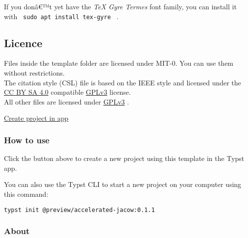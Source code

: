If you donâ€™t yet have the \emph{TeX Gyre Termes} font family, you can
install it with \texttt{\ sudo\ apt\ install\ tex-gyre\ } .


\subsection{Licence}\label{licence}

Files inside the template folder are licensed under MIT-0. You can use
them without restrictions.\\
The citation style (CSL) file is based on the IEEE style and licensed
under the \href{https://creativecommons.org/licenses/by-sa/4.0/}{CC BY
SA 4.0} compatible
\href{https://www.gnu.org/licenses/gpl-3.0.html}{GPLv3} license.\\
All other files are licensed under
\href{https://www.gnu.org/licenses/gpl-3.0.html}{GPLv3} .

\href{/app?template=accelerated-jacow&version=0.1.1}{Create project in
app}

\subsubsection{How to use}\label{how-to-use}

Click the button above to create a new project using this template in
the Typst app.

You can also use the Typst CLI to start a new project on your computer
using this command:

\begin{verbatim}
typst init @preview/accelerated-jacow:0.1.1
\end{verbatim}



\subsubsection{About}\label{about}


